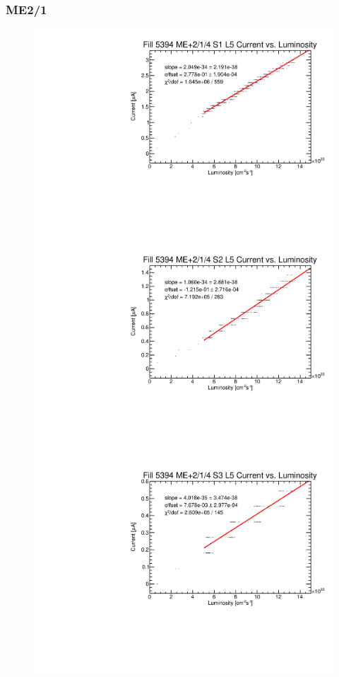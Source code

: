 \subsubsection{ME2/1}
\begin{figure}
    \centering
    \includegraphics[width=\twoThirdsFigWidth]{figures/neutron/ME21_P_04_1_5_f5394_curr_lumi.pdf}
    \includegraphics[width=\twoThirdsFigWidth]{figures/neutron/ME21_P_04_2_5_f5394_curr_lumi.pdf}
    \includegraphics[width=\twoThirdsFigWidth]{figures/neutron/ME21_P_04_3_5_f5394_curr_lumi.pdf}

\end{figure}
